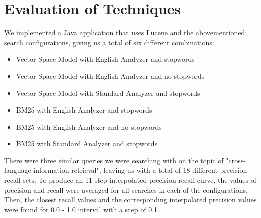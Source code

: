 \documentclass[parskip=full]{aaltoseries}
\begin{document}
\chapter{Evaluation of Techniques}
We implemented a Java application that uses Lucene and the abovementioned search configurations, giving us a total of six different combinations:
\begin{itemize}[noitemsep]
\item Vector Space Model with English Analyzer and stopwords
\item Vector Space Model with English Analyzer and no stopwords
\item Vector Space Model with Standard Analyzer and stopwords
\item BM25 with English Analyzer and stopwords
\item BM25 with English Analyzer and no stopwords
\item BM25 with Standard Analyzer and stopwords
\end{itemize}
There were three similar queries we were searching with on the topic of "cross-language information retrieval", leaving us with a total of 18 different precision-recall sets. To produce an 11-step interpolated precision-recall curve, the values of precision and recall were averaged for all searches in each of the configurations. Then, the closest recall values and the corresponding interpolated precision values were found for 0.0 - 1.0 interval with a step of 0.1. 
\end{document}
